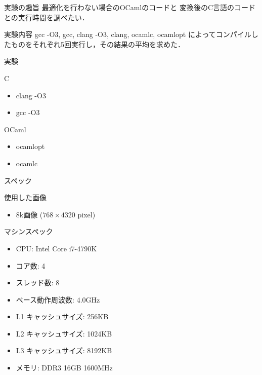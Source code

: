 \documentclass[14pt,dvipdfmx]{beamer}
\theoremstyle{definition}
\begin{document}
\begin{frame}{実験の趣旨}
  最適化を行わない場合のOCamlのコードと
  変換後のC言語のコードとの実行時間を調べたい．
\end{frame}
\begin{frame}{実験内容}
  gcc -O3, gcc, clang -O3, clang, ocamlc, ocamlopt によってコンパイルしたものをそれぞれ5回実行し，その結果の平均を求めた．
\end{frame}

\begin{frame}{実験}
  \begin{block}{C}
    \begin{itemize}
    \item clang -O3
    \item gcc -O3
    \end{itemize}
  \end{block}

  \begin{block}{OCaml}
    \begin{itemize}
    \item ocamlopt
    \item ocamlc
    \end{itemize}
  \end{block}
\end{frame}

\begin{frame}{スペック}
  \begin{block}{使用した画像}
    \begin{itemize}
    \item 8k画像 ($768 \times 4320$ pixel)
    \end{itemize}
  \end{block}
  \begin{block}{マシンスペック}
    \begin{itemize}
    \item CPU: Intel Core i7-4790K
    \item コア数: 4
    \item スレッド数: 8
    \item ベース動作周波数: 4.0GHz
    \item L1 キャッシュサイズ: 256KB
    \item L2 キャッシュサイズ: 1024KB
    \item L3 キャッシュサイズ: 8192KB
    \item メモリ: DDR3 16GB 1600MHz
    \end{itemize}
  \end{block}
\end{frame}
\end{document}
